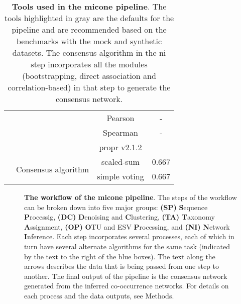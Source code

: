 \begin{table}[H]
\begin{tabular}{|c|c|c|c|}
                                          & & Pearson & - \\
                                          & & Spearman & - \\
                                          & & propr v2.1.2 & \cite{quinnProprRpackageIdentifying2017} \\ \cline{2-4}
                                          & \multirow{2}{*}{Consensus algorithm} & \rowcolor{lightgray} scaled-sum & 0.667 \\
                                          & & simple voting & 0.667 \\
      \hline
    \end{tabular}
    \caption{
      \textbf{Tools used in the \ac{micone} pipeline}.
      The tools highlighted in gray are the defaults for the pipeline and are recommended based on the benchmarks with the mock and synthetic datasets.
      The consensus algorithm in the \ac{ni} step incorporates all the modules (bootstrapping, direct association and correlation-based) in that step to generate the consensus network.
    }
    \label{tab:micone_tools}
  \end{table}

  \FloatBarrier
  \newpage
\begin{figure}[H]
    \centering
    \caption{
      \textbf{The workflow of the \ac{micone} pipeline}.
      The steps of the workflow can be broken down into five major groups: \textbf{(SP)} \textbf{S}equence \textbf{P}rocessig, \textbf{(DC)} \textbf{D}enoising and \textbf{C}lustering, \textbf{(TA)} \textbf{T}axonomy \textbf{A}ssignment, \textbf{(OP)} \textbf{O}TU and ESV \textbf{P}rocessing, and \textbf{(NI)} \textbf{N}etwork \textbf{I}nference.
      Each step incorporates several processes, each of which in turn have several alternate algorithms for the same task (indicated by the text to the right of the blue boxes).
      The text along the arrows describes the data that is being passed from one step to another.
      The final output of the pipeline is the consensus network generated from the inferred co-occurrence networks.
      For details on each process and the data outputs, see Methods.
    }
    \label{fig:figure1}
  \end{figure}

